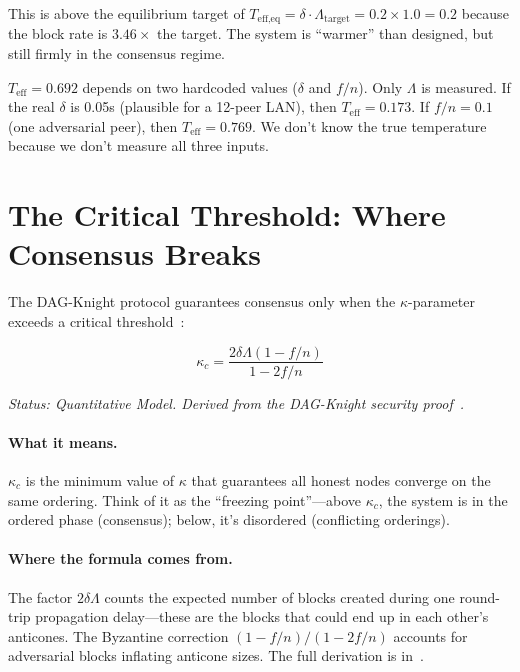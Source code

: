\documentclass[11pt,a4paper]{article}
\begin{document}
This is above the equilibrium target of $T_{\text{eff,eq}} = \delta \cdot \Lambda_{\text{target}} = 0.2 \times 1.0 = 0.2$ because the block rate is $3.46\times$ the target. The system is ``warmer'' than designed, but still firmly in the consensus regime.

\begin{honesty}
$T_{\text{eff}} = 0.692$ depends on two hardcoded values ($\delta$ and $f/n$). Only $\Lambda$ is measured. If the real $\delta$ is 0.05s (plausible for a 12-peer LAN), then $T_{\text{eff}} = 0.173$. If $f/n = 0.1$ (one adversarial peer), then $T_{\text{eff}} = 0.769$. We don't know the true temperature because we don't measure all three inputs.
\end{honesty}

\section{The Critical Threshold: Where Consensus Breaks}

The DAG-Knight protocol guarantees consensus only when the $\kappa$-parameter exceeds a critical threshold~\cite{dagknight,phantom}:

\begin{equation}
\boxed{\kappa_c = \frac{2\delta\Lambda(1-f/n)}{1-2f/n}}
\end{equation}

\emph{Status: \textcolor{hardcoded}{Quantitative Model}. Derived from the DAG-Knight security proof~\cite{dagknight}.}

\paragraph{What it means.} $\kappa_c$ is the minimum value of $\kappa$ that guarantees all honest nodes converge on the same ordering. Think of it as the ``freezing point''---above $\kappa_c$, the system is in the ordered phase (consensus); below, it's disordered (conflicting orderings).

\paragraph{Where the formula comes from.} The factor $2\delta\Lambda$ counts the expected number of blocks created during one round-trip propagation delay---these are the blocks that could end up in each other's anticones. The Byzantine correction $(1-f/n)/(1-2f/n)$ accounts for adversarial blocks inflating anticone sizes. The full derivation is in~\cite{dagknight}.
\end{document}
